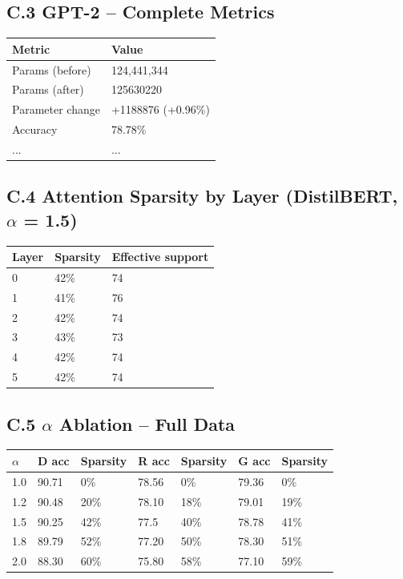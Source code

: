 \subsection{C.3 GPT-2 -- Complete Metrics}

\begin{table}[H]
\centering
\small
\begin{tabular}{ll}
\toprule
\textbf{Metric} & \textbf{Value} \\
\midrule
Params (before) & 124,441,344 \\
Params (after) & 125630220 \\
Parameter change & +1188876 (+0.96\%) \\
Accuracy & 78.78\% \\
... & ... \\
\bottomrule
\end{tabular}
\end{table}

\subsection{C.4 Attention Sparsity by Layer (DistilBERT, $\alpha$ = 1.5)}

\begin{table}[H]
\centering
\small
\begin{tabular}{lll}
\toprule
\textbf{Layer} & \textbf{Sparsity} & \textbf{Effective support} \\
\midrule
0 & 42\% & 74 \\
1 & 41\% & 76 \\
2 & 42\% & 74 \\
3 & 43\% & 73 \\
4 & 42\% & 74 \\
5 & 42\% & 74 \\
\bottomrule
\end{tabular}
\end{table}

\subsection{C.5 $\alpha$ Ablation -- Full Data}

\begin{table}[H]
\centering
\small
\begin{tabular}{lllllll}
\toprule
\textbf{$\alpha$} & \textbf{D acc} & \textbf{Sparsity} & \textbf{R acc} & \textbf{Sparsity} & \textbf{G acc} & \textbf{Sparsity} \\
\midrule
1.0 & 90.71 & 0\% & 78.56 & 0\% & 79.36 & 0\% \\
1.2 & 90.48 & 20\% & 78.10 & 18\% & 79.01 & 19\% \\
1.5 & 90.25 & 42\% & 77.5 & 40\% & 78.78 & 41\% \\
1.8 & 89.79 & 52\% & 77.20 & 50\% & 78.30 & 51\% \\
2.0 & 88.30 & 60\% & 75.80 & 58\% & 77.10 & 59\% \\
\bottomrule
\end{tabular}
\end{table}

